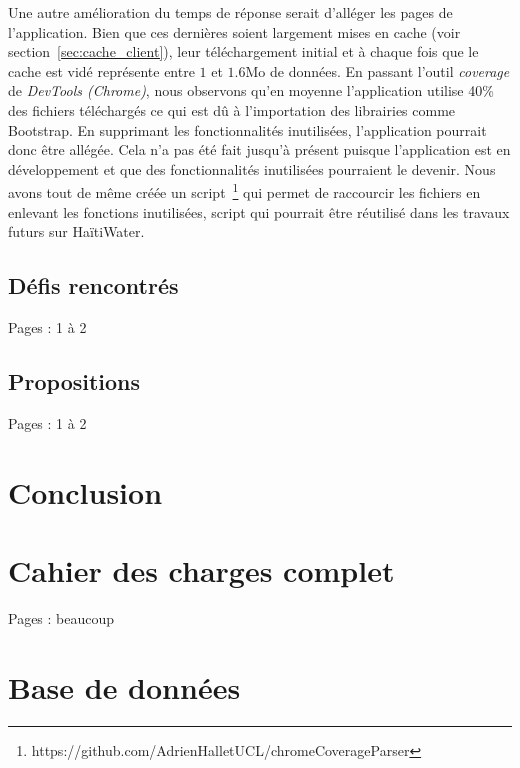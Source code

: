 \documentclass{EPL-master-thesis-covers-FR}
\begin{document}
			Une autre amélioration du temps de réponse serait d'alléger les pages de l'application. Bien que ces dernières soient largement mises en cache (voir section~\ref{sec:cache_client}), leur téléchargement initial et à chaque fois que le cache est vidé représente entre $1$ et $1.6$Mo de données. En passant l'outil \emph{coverage} de \emph{DevTools (Chrome)}, nous observons qu'en moyenne l'application utilise 40\% des fichiers téléchargés ce qui est dû à l'importation des librairies comme Bootstrap. En supprimant les fonctionnalités inutilisées, l'application pourrait donc être allégée. Cela n'a pas été fait jusqu'à présent puisque l'application est en développement et que des fonctionnalités inutilisées pourraient le devenir. Nous avons tout de même créée un script~\footnote{https://github.com/AdrienHalletUCL/chromeCoverageParser} qui permet de raccourcir les fichiers en enlevant les fonctions inutilisées, script qui pourrait être réutilisé dans les travaux futurs sur HaïtiWater.

		\section{Défis rencontrés}

			Pages : 1 à 2

		\section{Propositions}

			Pages : 1 à 2

	\chapter{Conclusion}



	{}
	


	\appendix

	\chapter{Cahier des charges complet}

		Pages : beaucoup

	\chapter{Base de données}
\end{document}
